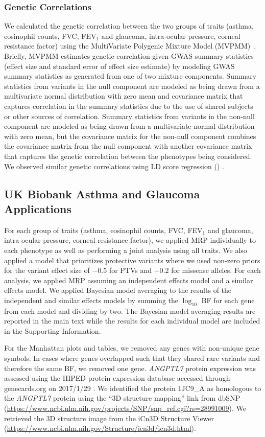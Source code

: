 \subsubsection*{Genetic Correlations}
We calculated the genetic correlation between the two groups of traits (asthma, eosinophil counts, FVC, FEV$_1$ and glaucoma, intra-ocular pressure, corneal resistance factor) using the MultiVariate Polygenic Mixture Model (MVPMM)~\cite{DeBoever2017}. Briefly, MVPMM estimates genetic correlation given GWAS summary statistics (effect size and standard error of effect size estimate) by modeling GWAS summary statistics as generated from one of two mixture components. Summary statistics from variants in the null component are modeled as being drawn from a multivariate normal distribution with zero mean and covariance matrix that captures correlation in the summary statistics due to the use of shared subjects or other sources of correlation. Summary statistics from variants in the non-null component are modeled as being drawn from a multivariate normal distribution with zero mean, but the covariance matrix for the non-null component combines the covariance matrix from the null component with another covariance matrix that captures the genetic correlation between the phenotypes being considered. We observed similar genetic correlations using LD score regression () \cite{gencorr2015}.

\subsection*{UK Biobank Asthma and Glaucoma Applications}
For each group of traits (asthma, eosinophil counts, FVC, FEV$_1$ and glaucoma, intra-ocular pressure, corneal resistance factor), we applied MRP individually to each phenotype as well as performing a joint analysis using all traits. We also applied a model that prioritizes protective variants where we used non-zero priors for the variant effect size of $-0.5$ for PTVs and $-0.2$ for missense alleles. For each analysis, we applied MRP assuming an independent effects model and a similar effects model. We applied Bayesian model averaging to the results of the independent and similar effects models by summing the $\log_{10}$ BF for each gene from each model and dividing by two. The Bayesian model averaging results are reported in the main text while the results for each individual model are included in the Supporting Information. 
	
For the Manhattan plots and tables, we removed any genes with non-unique gene symbols. In cases where genes overlapped such that they shared rare variants and therefore the same BF, we removed one gene. \textit{ANGPTL7} protein expression was assessed using the HIPED protein expression database accessed through genecards.org on 2017/1/29 \cite{Fishilevich:2016hx}. We identified the protein 1JC9\_A as homologous to the \textit{ANGPTL7} protein using the ``3D structure mapping'' link from dbSNP (\url{https://www.ncbi.nlm.nih.gov/projects/SNP/snp_ref.cgi?rs=28991009}). We retrieved the 3D structure image from the iCn3D Structure Viewer (\url{https://www.ncbi.nlm.nih.gov/Structure/icn3d/icn3d.html}). 

